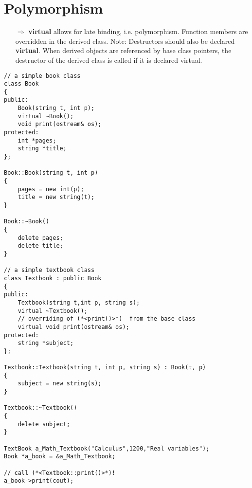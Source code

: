 \documentclass[10pt]{article}
\begin{document}
\section{Polymorphism}
\small
\begin{enumerate}
\item[$\Rightarrow$] \textbf{virtual} allows for late binding, i.e.
polymorphism. Function members are
overridden in the derived class. Note: Destructors should also be
 declared \textbf{virtual}. When derived
objects are referenced by base class
pointers, the destructor of the derived class
is called if it is declared virtual.
\end{enumerate}
\begin{lstlisting}
// a simple book class
class Book
{
public:
    Book(string t, int p);
    virtual ~Book();
    void print(ostream& os);
protected:
    int *pages;
    string *title;
};

Book::Book(string t, int p)
{
    pages = new int(p);
    title = new string(t);
}

Book::~Book()
{
    delete pages;
    delete title;
}

// a simple textbook class
class Textbook : public Book
{
public:
    Textbook(string t,int p, string s);
    virtual ~Textbook();
    // overriding of (*<print()>*)  from the base class
    virtual void print(ostream& os);
protected:
    string *subject;
};

Textbook::Textbook(string t, int p, string s) : Book(t, p)
{
    subject = new string(s);
}

Textbook::~Textbook()
{
    delete subject;
}

TextBook a_Math_Textbook("Calculus",1200,"Real variables");
Book *a_book = &a_Math_Textbook;

// call (*<Textbook::print()>*)!
a_book->print(cout);
\end{lstlisting}
%
%
\end{document}
